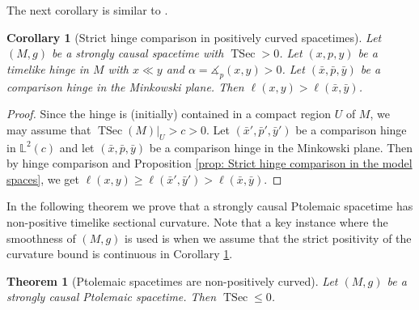 \documentclass[hidelinks,12pt,a4paper]{article}
\numberwithin{equation}{section}
\theoremstyle{plain}
\newtheorem{theorem}[definition]{Theorem}
\newtheorem{corollary}[definition]{Corollary}
\theoremstyle{definition}
\newcommand{\lm}[1]{\mathbb{L}^2(#1)}
\newcommand*{\bx}{\bar{x}}
\newcommand*{\by}{\bar{y}}
\newcommand*{\bp}{\bar{p}}
\newcommand{\ma}{\ensuremath{\measuredangle}}
\DeclareMathOperator{\TSec}{TSec}
\begin{document}
The next corollary is similar to \cite[Corollary 4.4]{BuFaWra}. 

\begin{corollary}[Strict hinge comparison in positively curved spacetimes]
\label{cor: Strict hinge comparison in positively curved spacetime}
Let $(M,g)$ be a strongly causal spacetime with $\TSec > 0$. 
Let $(x,p,y)$ be a timelike hinge in $M$ with $x \ll y$ and $\alpha=\ma_p(x,y) > 0$. 
Let $(\bx,\bp,\by)$ be a comparison hinge in the Minkowski plane. 
Then $\ell(x,y) > \ell(\bx,\by)$. 
\end{corollary}

\begin{proof}
Since the hinge is (initially) contained in a compact region $U$ of $M$, we may assume that $\TSec(M)|_U > c > 0$. 
Let $(\bx',\bp',\by')$ be a comparison hinge in $\lm{c}$ and let $(\bx,\bp,\by)$ be a comparison hinge in the Minkowski plane. 
Then by hinge comparison and Proposition \ref{prop: Strict hinge comparison in the model spaces}, we get $\ell(x,y) \geq \ell(\bx',\by') > \ell(\bx,\by)$. 
\end{proof}

In the following theorem we prove that a strongly causal Ptolemaic spacetime has non-positive timelike sectional curvature. Note that a key instance where the smoothness of $(M,g)$ is used is when we assume that the strict positivity of the curvature bound is continuous in Corollary \ref{cor: Strict hinge comparison in positively curved spacetime}.  

\begin{theorem}[Ptolemaic spacetimes are non-positively curved]
\label{thm: ptolemy implies NPC}
Let $(M,g)$ be a strongly causal Ptolemaic spacetime. 
Then $\TSec \leq 0$. 
\end{theorem}
\end{document}
